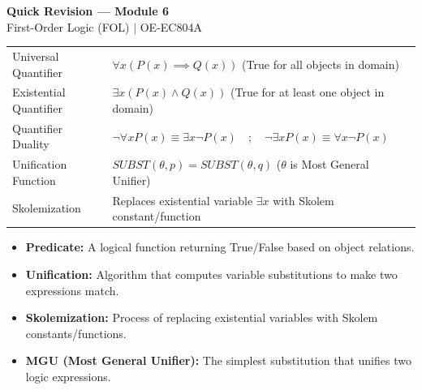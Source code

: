 \documentclass[12pt,a4paper]{article}
\renewcommand{\arraystretch}{1.45}
\begin{document}
\newpage
\begin{center}
  {\large\bfseries\color{myred} Quick Revision --- Module 6}\\[3pt]
  {\small\color{mydark} First-Order Logic (FOL) $|$ OE-EC804A}
\end{center}
\noindent{\color{myred}\rule{\linewidth}{1.2pt}}
\vspace{4pt}

\begin{tcolorbox}[formulabox, title={\textbf{Key Concepts and Metrics at a Glance}}]
\renewcommand{\arraystretch}{1.35}
\begin{tabularx}{\linewidth}{B{4.5cm} X}
Universal Quantifier & $\forall x (P(x) \implies Q(x))$ \quad (True for all objects in domain) \\[4pt]
Existential Quantifier & $\exists x (P(x) \land Q(x))$ \quad (True for at least one object in domain) \\[4pt]
Quantifier Duality & $\neg \forall x P(x) \equiv \exists x \neg P(x) \quad ; \quad \neg \exists x P(x) \equiv \forall x \neg P(x)$ \\[4pt]
Unification Function & $SUBST(\theta, p) = SUBST(\theta, q)$ \quad ($\theta$ is Most General Unifier) \\[4pt]
Skolemization & Replaces existential variable $\exists x$ with Skolem constant/function \\
\end{tabularx}
\end{tcolorbox}

\begin{tcolorbox}[defbox, title={\textbf{One-Line Definitions}}]
  \begin{itemize}[leftmargin=*, noitemsep]
    \item \textbf{Predicate:} A logical function returning True/False based on object relations.
    \item \textbf{Unification:} Algorithm that computes variable substitutions to make two expressions match.
    \item \textbf{Skolemization:} Process of replacing existential variables with Skolem constants/functions.
    \item \textbf{MGU (Most General Unifier):} The simplest substitution that unifies two logic expressions.
  \end{itemize}
\end{tcolorbox}
\end{document}
